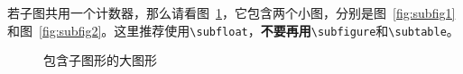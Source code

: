 若子图共用一个计数器，那么请看图~\ref{fig:big1}，它包含两个小图，分别是图~\ref{fig:subfig1}和图~\ref{fig:subfig2}。这里推荐使用\verb|\subfloat|，{\bf 不要再用}\verb|\subfigure|和\verb|\subtable|。
\begin{figure}[htb]
    \centering%
    \hspace{4em}%
    \caption{包含子图形的大图形}
    \label{fig:big1}
\end{figure}


